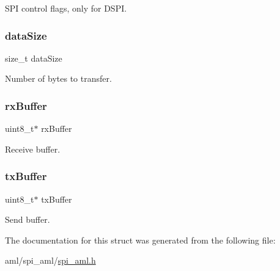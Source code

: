 S\+PI control flags, only for D\+S\+PI. \mbox{\label{structspi__aml__transfer__t_a78f9703861dd365a513c2c5aab9f9239}} 
\subsubsection{\texorpdfstring{dataSize}{dataSize}}
{\footnotesize\ttfamily size\+\_\+t data\+Size}

Number of bytes to transfer. \mbox{\label{structspi__aml__transfer__t_a765da49a944f3916b674154f54e4edfa}} 
\subsubsection{\texorpdfstring{rxBuffer}{rxBuffer}}
{\footnotesize\ttfamily uint8\+\_\+t$\ast$ rx\+Buffer}

Receive buffer. \mbox{\label{structspi__aml__transfer__t_a9e34d8d39e2adcd636dea42296da5aa7}} 
\subsubsection{\texorpdfstring{txBuffer}{txBuffer}}
{\footnotesize\ttfamily uint8\+\_\+t$\ast$ tx\+Buffer}

Send buffer. 

The documentation for this struct was generated from the following file\+:\begin{DoxyCompactItemize}
\item 
aml/spi\+\_\+aml/\mbox{\hyperlink{spi__aml_8h}{spi\+\_\+aml.\+h}}\end{DoxyCompactItemize}
